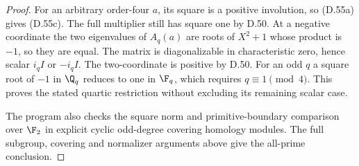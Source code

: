 \begin{proof}
For an arbitrary order-four $a$,
its square is a positive involution,
so (D.55a) gives (D.55c).
The full multiplier still has square
one by D.50.
At a negative coordinate the two
eigenvalues of $A_q(a)$ are roots
of $X^2+1$ whose product is $-1$,
so they are equal.
The matrix is diagonalizable in
characteristic zero, hence scalar
$i_q I$ or $-i_q I$.
The two-coordinate is positive by
D.50. For an odd $q$ a square
root of $-1$ in $\Q_q$ reduces to
one in $\F_q$, which requires
$q\equiv1\pmod4$.
This proves the stated quartic
restriction without excluding its
remaining scalar case.

The program
also checks the square norm and
primitive-boundary comparison over
$\F_2$ in explicit cyclic odd-degree
covering homology modules.
The full subgroup, covering and
normalizer arguments above give
the all-prime conclusion.
\end{proof}
